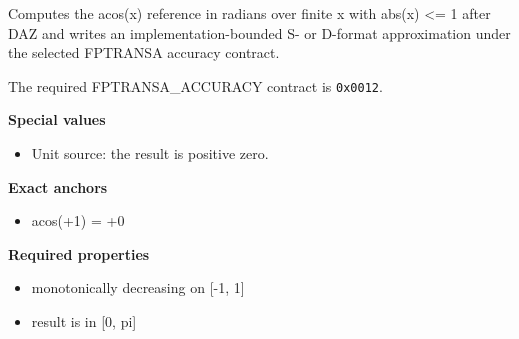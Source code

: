 Computes the acos(x) reference in radians over finite x with abs(x) \textless{}= 1 after DAZ and writes an implementation-bounded S- or D-format approximation under the selected FPTRANSA accuracy contract.

The required FPTRANSA\_ACCURACY contract is \texttt{0x0012}.

\textbf{Special values}\par
\begin{itemize}
\item Unit source: the result is positive zero.
\end{itemize}

\textbf{Exact anchors}\par
\begin{itemize}
\item acos(+1) = +0
\end{itemize}

\textbf{Required properties}\par
\begin{itemize}
\item monotonically decreasing on [-1, 1]
\item result is in [0, pi]
\end{itemize}
